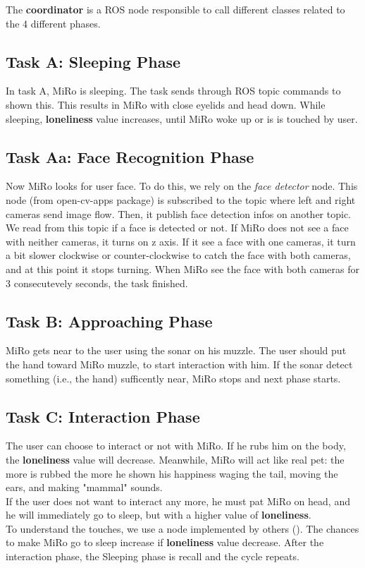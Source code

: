 \documentclass[12pt,peerreviewca, a4paper, onecolumn]{IEEEtran}
\begin{document}
	The \textbf{coordinator} is a ROS node responsible to call different classes related to the 4 different phases. 	
	\subsection{Task A: Sleeping Phase}
	In task A, MiRo is sleeping. The task sends through ROS topic commands to shown this. This results in MiRo with close eyelids and head down. While sleeping, \textbf{loneliness} value increases, until MiRo woke up or is is touched by user.
	\subsection{Task Aa: Face Recognition Phase}
	Now MiRo looks for user face. To do this, we rely on the \textit{face detector} node. This node (from open-cv-apps package) is subscribed to the topic where left and right cameras send image flow. Then, it publish face detection infos on another topic. We read from this topic if a face is detected or not.
	If MiRo does not see a face with neither cameras, it turns on z axis. If it see a face with one cameras, it turn a bit slower clockwise or counter-clockwise to catch the face with both cameras, and at this point it stops turning. When MiRo see the face with both cameras for 3 consecutevely seconds, the task finished.
	\subsection{Task B: Approaching Phase}
	MiRo gets near to the user using the sonar on his muzzle. The user should put the hand toward MiRo muzzle, to start interaction with him. If the sonar detect something (i.e., the hand) sufficently near, MiRo stops and next phase starts.
	\subsection{Task C: Interaction Phase}  
	The user can choose to interact or not with MiRo. If he rubs him on the body, the \textbf{loneliness} value will decrease. Meanwhile, MiRo will act like real pet: the more is rubbed the more he shown his happiness waging the tail, moving the ears, and making "mammal" sounds.\\
	If the user does not want to interact any more, he must pat MiRo on head, and he will immediately go to sleep, but with a higher value of \textbf{loneliness}.\\
	To understand the touches, we use a node implemented by others ().
	The chances to make MiRo go to sleep increase if \textbf{loneliness} value decrease. After the interaction phase, the Sleeping phase is recall and the cycle repeats. 
	
\end{document}
